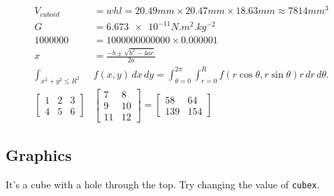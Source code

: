 \begin{align*}
	V_{cuboid} &= w h l = 20.49\si{mm} \times 20.47\si{mm} \times 18.63\si{mm} \approx 7814\si{mm^{3}} \\ 
	G &= \num{6.673e-11}\si{N.m^{2}.kg^{-2}} \\ 
	\num{1000000} &= \num{1000000000000} \times \num{0.000001} \\
	x &= \frac{-b \pm \sqrt{b^2 - 4ac}}{2a} \\
	\int_{x^2 + y^2 \leq R^2} & f(x,y)\,dx\,dy
	    = \int_{\theta=0}^{2\pi} \int_{r=0}^R f(r\cos\theta,r\sin\theta) r\,dr\,d\theta. \\
    \begin{bmatrix} 1 & 2 & 3 \\ 4 & 5 & 6 \end{bmatrix}&
        \begin{bmatrix} 7 & 8 \\ 9 & 10 \\ 11 & 12 \end{bmatrix} =
        \begin{bmatrix} 58 & 64 \\ 139 & 154 \end{bmatrix}
\end{align*}

\subsection{Graphics}

It's a cube with a hole through the top. Try changing the value of \texttt{cubex}.

